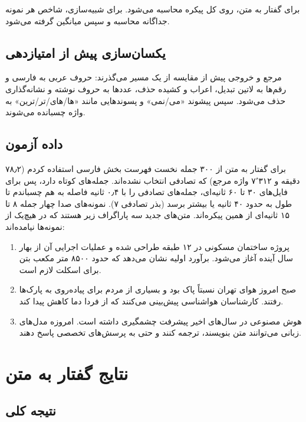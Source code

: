 \documentclass[11pt,a4paper]{article}
\newcommand{\en}[1]{\lr{#1}}
\begin{document}
برای گفتار به متن، \en{WER} روی کل پیکره محاسبه می‌شود. برای شبیه‌سازی، شاخص هر نمونه جداگانه محاسبه و سپس میانگین گرفته می‌شود.

\subsection{یکسان‌سازی پیش از امتیازدهی}

مرجع و خروجی پیش از مقایسه از یک مسیر می‌گذرند: حروف عربی به فارسی و رقم‌ها به لاتین تبدیل، اعراب و کشیده حذف، عددها به حروف نوشته و نشانه‌گذاری حذف می‌شود. سپس پیشوند «می/نمی» و پسوندهایی مانند «ها/های/تر/ترین» به واژه چسبانده می‌شوند.

\subsection{داده آزمون}

برای گفتار به متن از ۳۰۰ جمله نخست فهرست بخش \en{test} فارسی \en{FLEURS} استفاده کردم (۷۸٫۲ دقیقه و ۷٬۳۱۲ واژه مرجع) که تصادفی انتخاب نشده‌اند. \en{FLEURS} جمله‌های کوتاه دارد، پس برای فایل‌های ۳۰ تا ۶۰ ثانیه‌ای، جمله‌های تصادفی را با ۰٫۴ ثانیه فاصله به هم چسباندم تا طول به حدود ۴۰ ثانیه یا بیشتر برسد (بذر تصادفی ۷). نمونه‌های صدا چهار جمله ۸ تا ۱۵ ثانیه‌ای از همین پیکره‌اند. متن‌های جدید سه پاراگراف زیر هستند که در هیچ‌یک از نمونه‌ها نیامده‌اند:

\begin{enumerate}
\item پروژه ساختمان مسکونی در ۱۲ طبقه طراحی شده و عملیات اجرایی آن از بهار سال آینده آغاز می‌شود. برآورد اولیه نشان می‌دهد که حدود ۸۵۰۰ متر مکعب بتن برای اسکلت لازم است.
\item صبح امروز هوای تهران نسبتاً پاک بود و بسیاری از مردم برای پیاده‌روی به پارک‌ها رفتند. کارشناسان هواشناسی پیش‌بینی می‌کنند که از فردا دما کاهش پیدا کند.
\item هوش مصنوعی در سال‌های اخیر پیشرفت چشمگیری داشته است. امروزه مدل‌های زبانی می‌توانند متن بنویسند، ترجمه کنند و حتی به پرسش‌های تخصصی پاسخ دهند.
\end{enumerate}

\clearpage
\section{نتایج گفتار به متن}\label{sec:stt}

\subsection{نتیجه کلی}
\end{document}
